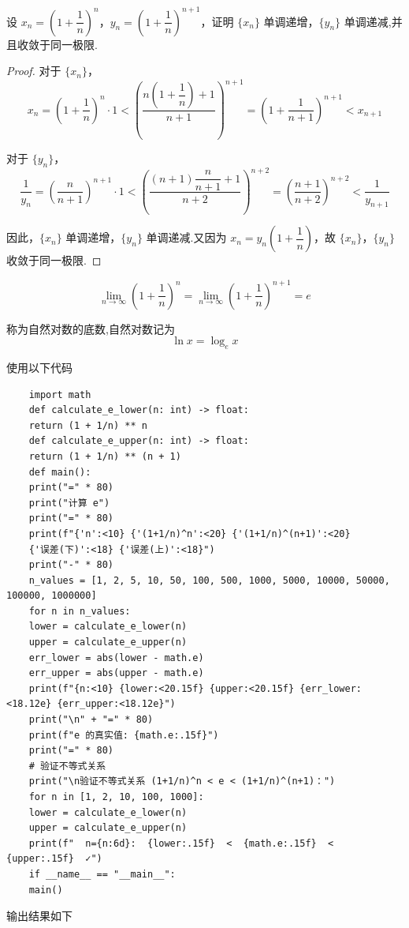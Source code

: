 \begin{proposition}
	设 $x_n = \left(1 + \dfrac{1}{n}\right)^n$，$y_n = \left(1 + \dfrac{1}{n}\right)^{n+1}$，证明 $\{x_n\}$ 单调递增，$\{y_n\}$ 单调递减,并且收敛于同一极限.
\end{proposition}
\begin{proof}
	对于 $\{x_n\}$，
	\[
	x_n = \left(1 + \frac{1}{n}\right)^n\cdot 1 < \left(\dfrac{n(1 + \dfrac{1}{n})+1}{n+1}\right)^{n+1} = \left(1 + \dfrac{1}{n+1}\right)^{n+1} < x_{n+1}
	\]
	
	对于 $\{y_n\}$，
	\[
	\frac{1}{y_n} = \left(\dfrac{n}{n+1}\right)^{n+1}\cdot 1 < \left(\dfrac{(n+1)\dfrac{n}{n+1}+1}{n+2}\right)^{n+2} = \left(\dfrac{n+1}{n+2}\right)^{n+2} < \frac{1}{y_{n+1}}
	\]
	
	因此，$\{x_n\}$ 单调递增，$\{y_n\}$ 单调递减.又因为 $x_n = y_n(1+\dfrac{1}{n})$，故 $\{x_n\}$，$\{y_n\}$ 收敛于同一极限.
	
	
\end{proof}
\begin{definition}
	\[
	\lim_{n \to \infty} \left(1 + \frac{1}{n}\right)^n = \lim_{n \to \infty} \left(1 + \frac{1}{n}\right)^{n+1} = e
	\]
	
	称为自然对数的底数,自然对数记为
	\[
	\ln x = \log_e x
	\]
	
\end{definition}
使用以下代码
\begin{verbatim}
	import math
	def calculate_e_lower(n: int) -> float:
	return (1 + 1/n) ** n
	def calculate_e_upper(n: int) -> float:
	return (1 + 1/n) ** (n + 1)
	def main():
	print("=" * 80)
	print("计算 e")
	print("=" * 80)
	print(f"{'n':<10} {'(1+1/n)^n':<20} {'(1+1/n)^(n+1)':<20} 
	{'误差(下)':<18} {'误差(上)':<18}")
	print("-" * 80)
	n_values = [1, 2, 5, 10, 50, 100, 500, 1000, 5000, 10000, 50000, 100000, 1000000]
	for n in n_values:
	lower = calculate_e_lower(n)
	upper = calculate_e_upper(n)
	err_lower = abs(lower - math.e)
	err_upper = abs(upper - math.e)
	print(f"{n:<10} {lower:<20.15f} {upper:<20.15f} {err_lower:<18.12e} {err_upper:<18.12e}")
	print("\n" + "=" * 80)
	print(f"e 的真实值: {math.e:.15f}")
	print("=" * 80)
	# 验证不等式关系
	print("\n验证不等式关系 (1+1/n)^n < e < (1+1/n)^(n+1)：")
	for n in [1, 2, 10, 100, 1000]:
	lower = calculate_e_lower(n)
	upper = calculate_e_upper(n)
	print(f"  n={n:6d}:  {lower:.15f}  <  {math.e:.15f}  <  {upper:.15f}  ✓")
	if __name__ == "__main__":
	main()
\end{verbatim}
输出结果如下
